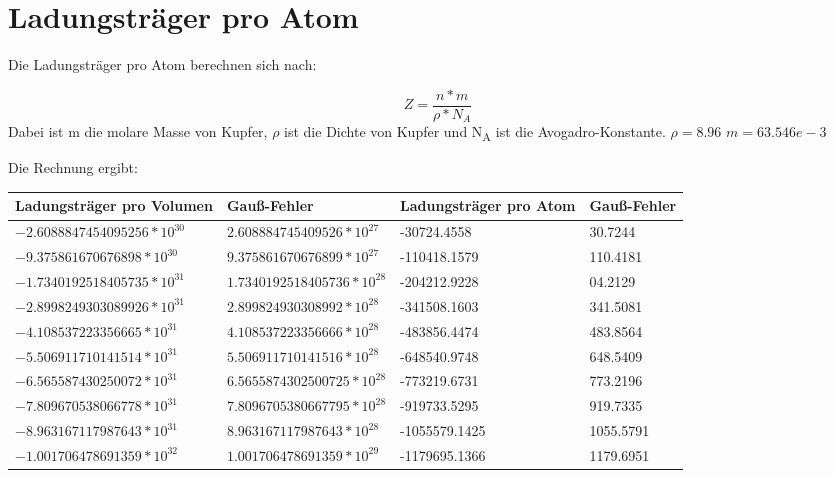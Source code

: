 \documentclass[titlepage=firstcover, captions=tableheading]{scrartcl}
\begin{document}
\section{Ladungsträger pro Atom}

Die Ladungsträger pro Atom berechnen sich nach:

\begin{displaymath}
    
    Z= \frac{n*m}{\rho * N_A}
\end{displaymath}
Dabei ist m die molare Masse von Kupfer, $\rho$ ist die Dichte von Kupfer und N\textsubscript{A} ist die Avogadro-Konstante.
$\rho = 8.96$
$m = 63.546e-3$

Die Rechnung ergibt:
\begin{center}
    \begin{tabular}{l @{${}\pm{}$}ll @{${}\pm{}$}l}\\
        \toprule
        Ladungsträger pro Volumen & Gauß-Fehler & Ladungsträger pro Atom & Gauß-Fehler\\
        \midrule
        $-2.6088847454095256*10^{30}$ &  $2.608884745409526 *10^{27} $  &   -30724.4558 &  30.7244\\
        $-9.375861670676898 *10^{30}$  & $9.375861670676899  *10^{27}$    &  -110418.1579 &  110.4181\\
        $-1.7340192518405735*10^{31}$ &  $1.7340192518405736*10^{28} $ &  -204212.9228 &   04.2129   \\   
        $-2.8998249303089926*10^{31}$ &  $2.899824930308992 *10^{28} $  &  -341508.1603 &  341.5081\\
        $-4.108537223356665 *10^{31}$  & $4.108537223356666  *10^{28}$    &  -483856.4474 &   483.8564\\
        $-5.506911710141514 *10^{31}$  & $5.506911710141516  *10^{28}$     &  -648540.9748 &   648.5409\\
        $-6.565587430250072 *10^{31}$  & $6.5655874302500725 *10^{28}$   &  -773219.6731 &   773.2196 \\
        $-7.809670538066778 *10^{31}$  & $7.8096705380667795 *10^{28}$   &  -919733.5295 &    919.7335 \\ 
        $-8.963167117987643 *10^{31}$  & $8.963167117987643  *10^{28}$    &  -1055579.1425 &  1055.5791 \\
        $-1.001706478691359 *10^{32}$  & $1.001706478691359  *10^{29}$   &  -1179695.1366 &  1179.6951 \\
        \bottomrule
    \end{tabular}
\end{center}
\end{document}
